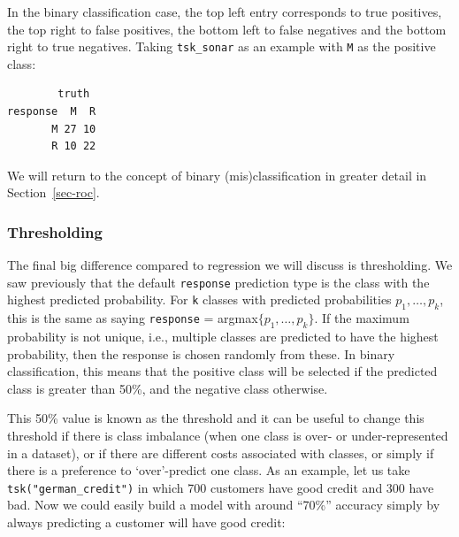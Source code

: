 In the binary classification case, the top left entry corresponds to
true positives, the top right to false
positives, the bottom left to false
negatives and the bottom right to true
negatives. Taking \texttt{tsk\_sonar} as an
example with \texttt{M} as the positive class:

\begin{Shaded}
\begin{Highlighting}[]
\OtherTok{=} 
\SpecialCharTok{$}
  \SpecialCharTok{$}\SpecialCharTok{$}
  \SpecialCharTok{$}\SpecialCharTok{$}
\end{Highlighting}
\end{Shaded}

\begin{verbatim}
        truth
response  M  R
       M 27 10
       R 10 22
\end{verbatim}

We will return to the concept of binary (mis)classification in greater
detail in Section~\ref{sec-roc}.

\hypertarget{thresholding}{%
\subsubsection*{Thresholding}\label{thresholding}}

The final big difference compared to regression we will discuss is
thresholding.
We saw previously that the default \texttt{response} prediction type is
the class with the highest predicted probability. For \texttt{k} classes
with predicted probabilities \(p_1,\dots,p_k\), this is the same as
saying \texttt{response} = argmax\(\{p_1,\dots,p_k\}\). If the maximum
probability is not unique, i.e., multiple classes are predicted to have
the highest probability, then the response is chosen randomly from
these. In binary classification, this means that the positive class will
be selected if the predicted class is greater than 50\%, and the
negative class otherwise.

This 50\% value is known as the threshold and it can be useful to change
this threshold if there is class imbalance (when one class is over- or
under-represented in a dataset), or if there are different costs
associated with classes, or simply if there is a preference to
`over'-predict one class. As an example, let us take
\texttt{tsk("german\_credit")} in which 700 customers have good credit
and 300 have bad. Now we could easily build a model with around ``70\%''
accuracy simply by always predicting a customer will have good credit:

